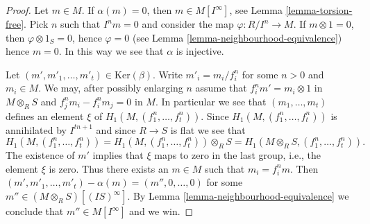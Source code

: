 \begin{proof}
Let $m \in M$. If $\alpha(m) = 0$, then $m \in M[I^\infty]$, see
Lemma \ref{lemma-torsion-free}. Pick $n$ such that $I^n m = 0$
and consider the map $\varphi : R/I^n \to M$.
If $m \otimes 1 = 0$, then $\varphi \otimes 1_S = 0$, hence
$\varphi = 0$ (see
Lemma \ref{lemma-neighbourhood-equivalence})
hence $m = 0$. In this way we see that $\alpha$ is injective.

\medskip\noindent
Let $(m', m'_1, \ldots, m'_t) \in \text{Ker}(\beta)$.
Write $m'_i = m_i/f_i^n$ for some $n > 0$ and $m_i \in M$.
We may, after possibly enlarging $n$ assume that
$f_i^n m' = m_i \otimes 1$ in $M \otimes_R S$ and
$f_j^nm_i - f_i^nm_j = 0$ in $M$.
In particular we see that
$(m_1, \ldots, m_t)$ defines an element $\xi$ of
$H_1(M, (f_1^n, \ldots, f_t^n))$.
Since $H_1(M, (f_1^n, \ldots, f_t^n))$ is annihilated by $I^{tn + 1}$
and since $R \to S$ is flat we see that
$$
H_1(M, (f_1^n, \ldots, f_t^n)) =
H_1(M, (f_1^n, \ldots, f_t^n)) \otimes_R S =
H_1(M \otimes_R S, (f_1^n, \ldots, f_t^n)).
$$
The existence of $m'$ implies that $\xi$ maps to zero in the last group, i.e.,
the element $\xi$ is zero. Thus there exists an $m \in M$ such that
$m_i = f_i^n m$. Then $(m', m'_1, \ldots, m'_t) - \alpha(m)
= (m'', 0, \ldots, 0)$ for some $m'' \in (M \otimes_R S)[(IS)^\infty]$.
By
Lemma \ref{lemma-neighbourhood-equivalence}
we conclude that $m'' \in M[I^\infty]$ and we win.
\end{proof}

